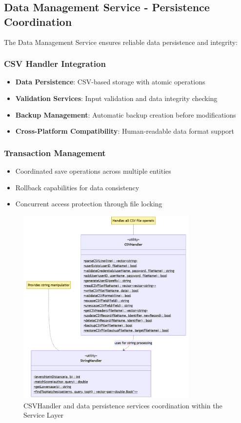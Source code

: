 \subsection{Data Management Service - Persistence Coordination}

The Data Management Service ensures reliable data persistence and integrity:

\subsubsection{CSV Handler Integration}
\begin{itemize}
	\item \textbf{Data Persistence}: CSV-based storage with atomic operations
	\item \textbf{Validation Services}: Input validation and data integrity checking
	\item \textbf{Backup Management}: Automatic backup creation before modifications
	\item \textbf{Cross-Platform Compatibility}: Human-readable data format support
\end{itemize}

\subsubsection{Transaction Management}
\begin{itemize}
	\item Coordinated save operations across multiple entities
	\item Rollback capabilities for data consistency
	\item Concurrent access protection through file locking
\end{itemize}

\begin{figure}[H]
	\centering
	\includegraphics[width=0.8\textwidth]{figures/string_handler.png}
	\caption{CSVHandler and data persistence services coordination within the Service Layer}
	\label{fig:data-management-service}
\end{figure}


